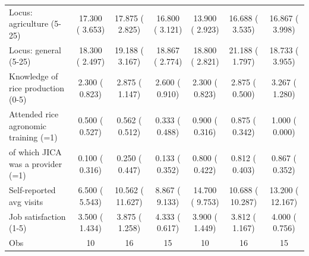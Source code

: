 \begin{tabular}{lcccccc}
Locus: agriculture (5-25) &    17.300 (    3.653) &    17.875 (    2.825) &    16.800 (    3.121) &    13.900 (    2.923) &    16.688 (    3.535) &    16.867 (    3.998)\sym{**} \\
Locus: general (5-25) &    18.300 (    2.497) &    19.188 (    3.167) &    18.867 (    2.774) &    18.800 (    2.821) &    21.188 (    1.797)\sym{***} &    18.733 (    3.955) \\
Knowledge of rice production (0-5) &     2.300 (    0.823) &     2.875 (    1.147) &     2.600 (    0.910) &     2.300 (    0.823) &     2.875 (    0.500)\sym{**} &     3.267 (    1.280)\sym{**} \\
Attended rice agronomic training (=1) &     0.500 (    0.527) &     0.562 (    0.512) &     0.333 (    0.488) &     0.900 (    0.316) &     0.875 (    0.342) &     1.000 (    0.000) \\
\quad of which JICA was a provider (=1) &     0.100 (    0.316) &     0.250 (    0.447) &     0.133 (    0.352) &     0.800 (    0.422) &     0.812 (    0.403) &     0.867 (    0.352) \\
Self-reported avg visits &     6.500 (    5.543) &    10.562 (   11.627) &     8.867 (    9.133) &    14.700 (    9.753) &    10.688 (   10.287) &    13.200 (   12.167) \\
Job satisfaction (1-5) &     3.500 (    1.434) &     3.875 (    1.258) &     4.333 (    0.617) &     3.900 (    1.449) &     3.812 (    1.167) &     4.000 (    0.756) \\
\midrule
Obs &        10 &        16 &        15 &        10 &        16 &        15 \\
\bottomrule
\end{tabular}
